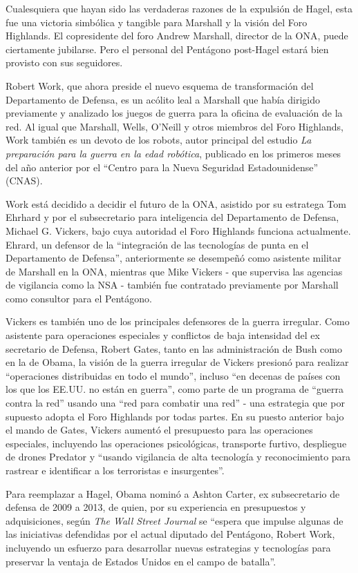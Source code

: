 \documentclass[10pt,a5paper,twoside,spanish,]{book}
\begin{document}
Cualesquiera que hayan sido las verdaderas razones de la expulsión de
Hagel, esta fue una victoria simbólica y tangible para Marshall y la
visión del Foro Highlands. El copresidente del foro Andrew Marshall,
director de la ONA, puede ciertamente jubilarse. Pero el personal del
Pentágono post-Hagel estará bien provisto con sus seguidores.

Robert Work, que ahora preside el nuevo esquema de transformación del
Departamento de Defensa, es un acólito leal a Marshall que había
dirigido previamente y analizado los juegos de guerra para la oficina de
evaluación de la red. Al igual que Marshall, Wells, O'Neill y otros
miembros del Foro Highlands, Work también es un devoto de los robots,
autor principal del estudio \emph{La preparación para la guerra en la
edad robótica}, publicado en los primeros meses del año anterior por el
``Centro para la Nueva Seguridad Estadounidense'' (CNAS).

Work está decidido a decidir el futuro de la ONA, asistido por su
estratega Tom Ehrhard y por el subsecretario para inteligencia del
Departamento de Defensa, Michael G. Vickers, bajo cuya autoridad el Foro
Highlands funciona actualmente. Ehrard, un defensor de la ``integración
de las tecnologías de punta en el Departamento de Defensa'',
anteriormente se desempeñó como asistente militar de Marshall en la ONA,
mientras que Mike Vickers - que supervisa las agencias de vigilancia
como la NSA - también fue contratado previamente por Marshall como
consultor para el Pentágono.

Vickers es también uno de los principales defensores de la guerra
irregular. Como asistente para operaciones especiales y conflictos de
baja intensidad del ex secretario de Defensa, Robert Gates, tanto en las
administración de Bush como en la de Obama, la visión de la guerra
irregular de Vickers presionó para realizar ``operaciones distribuidas
en todo el mundo'', incluso ``en decenas de países con los que los
EE.UU. no están en guerra'', como parte de un programa de ``guerra
contra la red'' usando una ``red para combatir una red'' - una
estrategia que por supuesto adopta el Foro Highlands por todas partes.
En su puesto anterior bajo el mando de Gates, Vickers aumentó el
presupuesto para las operaciones especiales, incluyendo las operaciones
psicológicas, transporte furtivo, despliegue de drones Predator y
``usando vigilancia de alta tecnología y reconocimiento para rastrear e
identificar a los terroristas e insurgentes''.

Para reemplazar a Hagel, Obama nominó a Ashton Carter, ex subsecretario
de defensa de 2009 a 2013, de quien, por su experiencia en presupuestos
y adquisiciones, según \emph{The Wall Street Journal} se ``espera que
impulse algunas de las iniciativas defendidas por el actual diputado del
Pentágono, Robert Work, incluyendo un esfuerzo para desarrollar nuevas
estrategias y tecnologías para preservar la ventaja de Estados Unidos en
el campo de batalla''.
\end{document}
